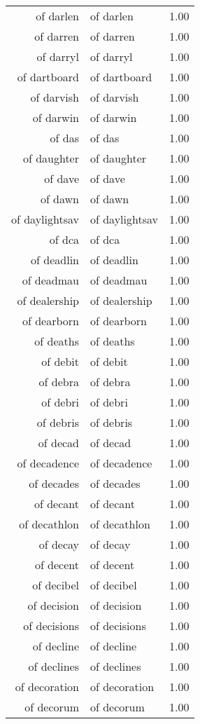 \begin{table}[ht]
\begin{tabular}{rlr}
  of darlen & of darlen & 1.00 \\ 
  of darren & of darren & 1.00 \\ 
  of darryl & of darryl & 1.00 \\ 
  of dartboard & of dartboard & 1.00 \\ 
  of darvish & of darvish & 1.00 \\ 
  of darwin & of darwin & 1.00 \\ 
  of das & of das & 1.00 \\ 
  of daughter & of daughter & 1.00 \\ 
  of dave & of dave & 1.00 \\ 
  of dawn & of dawn & 1.00 \\ 
  of daylightsav & of daylightsav & 1.00 \\ 
  of dca & of dca & 1.00 \\ 
  of deadlin & of deadlin & 1.00 \\ 
  of deadmau & of deadmau & 1.00 \\ 
  of dealership & of dealership & 1.00 \\ 
  of dearborn & of dearborn & 1.00 \\ 
  of deaths & of deaths & 1.00 \\ 
  of debit & of debit & 1.00 \\ 
  of debra & of debra & 1.00 \\ 
  of debri & of debri & 1.00 \\ 
  of debris & of debris & 1.00 \\ 
  of decad & of decad & 1.00 \\ 
  of decadence & of decadence & 1.00 \\ 
  of decades & of decades & 1.00 \\ 
  of decant & of decant & 1.00 \\ 
  of decathlon & of decathlon & 1.00 \\ 
  of decay & of decay & 1.00 \\ 
  of decent & of decent & 1.00 \\ 
  of decibel & of decibel & 1.00 \\ 
  of decision & of decision & 1.00 \\ 
  of decisions & of decisions & 1.00 \\ 
  of decline & of decline & 1.00 \\ 
  of declines & of declines & 1.00 \\ 
  of decoration & of decoration & 1.00 \\ 
  of decorum & of decorum & 1.00 \\ 

\end{tabular}
\end{table}
